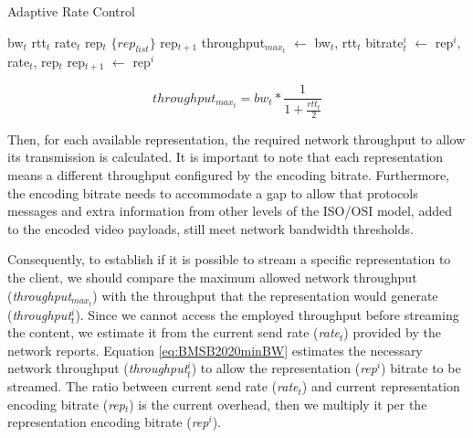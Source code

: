 \begin{algorithm}
	\renewcommand{\algorithmicrequire}{\textbf{Input:}}
	\renewcommand{\algorithmicensure}{\textbf{Output:}}
	\caption{Adaptive Rate Control}
	\label{alg:BMSB2020algorithm}
	\begin{algorithmic}
		\Require bw$_t$ 
		\Require rtt$_t$ 
		\Require rate$_t$ 
		\Require rep$_t$ 
		\Require $\{rep_{list}\}$ 
		\Ensure rep$_{t+1}$ 
		\State throughput$_{max_t}$ $\leftarrow$ bw$_{t}$, rtt$_{t}$ 
		 
		\State bitrate$^{i}_{t}$ $\leftarrow$ rep$^{i}$, rate$_{t}$, rep$_t$ 
		\State {}
		\State rep$_{t+1}$ $\leftarrow$ rep$^i$ 
		\EndIf
		\EndFor
		\EndFunction
	\end{algorithmic}
\end{algorithm}

\begin{equation}
\label{eq:BMSB2020thoughput}
throughput_{max_t} = bw_t * \frac{1}{1 + \frac{rtt_t}{2}}
\end{equation}

Then, for each available representation, the required network throughput to allow its transmission is calculated. It is important to note that each representation means a different throughput configured by the encoding bitrate. Furthermore, the encoding bitrate needs to accommodate a gap to allow that protocols messages and extra information from other levels of the ISO/OSI model, added to the encoded video payloads, still meet network bandwidth thresholds.

Consequently, to establish if it is possible to stream a specific representation to the client, we should compare the maximum allowed network throughput (\textit{throughput$_{max_t}$}) with the throughput that the representation would generate (\textit{throughput$^i_t$}). Since we cannot access the employed throughput before streaming the content, we estimate it from the current send rate (\textit{rate$_t$}) provided by the network reports. Equation \ref{eq:BMSB2020minBW} estimates the necessary network throughput (\textit{throughput$_t^i$}) to allow the representation (\textit{rep$^i$}) bitrate to be streamed. The ratio between current send rate (\textit{rate$_t$}) and current representation encoding bitrate (\textit{rep$_t$}) is the current overhead, then we multiply it per the representation encoding bitrate (\textit{rep$^i$}).

